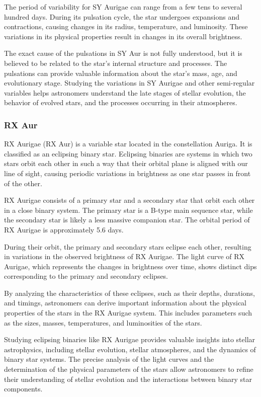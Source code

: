 The period of variability for SY Aurigae can range from a few tens to several hundred days. During its pulsation cycle, the star undergoes expansions and contractions, causing changes in its radius, temperature, and luminosity. These variations in its physical properties result in changes in its overall brightness.

The exact cause of the pulsations in SY Aur is not fully understood, but it is believed to be related to the star's internal structure and processes. The pulsations can provide valuable information about the star's mass, age, and evolutionary stage. Studying the variations in SY Aurigae and other semi-regular variables helps astronomers understand the late stages of stellar evolution, the behavior of evolved stars, and the processes occurring in their atmospheres.



\subsubsection*{ RX Aur }
RX Aurigae (RX Aur) is a variable star located in the constellation Auriga. It is classified as an eclipsing binary star. Eclipsing binaries are systems in which two stars orbit each other in such a way that their orbital plane is aligned with our line of sight, causing periodic variations in brightness as one star passes in front of the other.

RX Aurigae consists of a primary star and a secondary star that orbit each other in a close binary system. The primary star is a B-type main sequence star, while the secondary star is likely a less massive companion star. The orbital period of RX Aurigae is approximately 5.6 days.

During their orbit, the primary and secondary stars eclipse each other, resulting in variations in the observed brightness of RX Aurigae. The light curve of RX Aurigae, which represents the changes in brightness over time, shows distinct dips corresponding to the primary and secondary eclipses.

By analyzing the characteristics of these eclipses, such as their depths, durations, and timings, astronomers can derive important information about the physical properties of the stars in the RX Aurigae system. This includes parameters such as the sizes, masses, temperatures, and luminosities of the stars.

Studying eclipsing binaries like RX Aurigae provides valuable insights into stellar astrophysics, including stellar evolution, stellar atmospheres, and the dynamics of binary star systems. The precise analysis of the light curves and the determination of the physical parameters of the stars allow astronomers to refine their understanding of stellar evolution and the interactions between binary star components.

